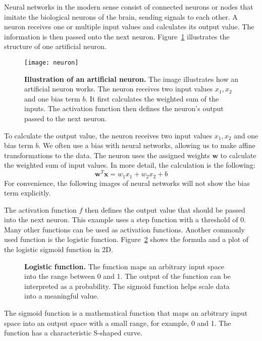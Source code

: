 Neural networks in the modern sense consist of connected neurons or nodes that imitate the biological neurons of the brain, sending signals to each other. A neuron receives one or multiple input values and calculates its output value. The information is then passed onto the next neuron. Figure~\ref{fig:neuron} illustrates the structure of one artificial neuron.
\begin{figure}[ht]
\centering
\texttt{[image: neuron]}
\caption[Illustration of an artificial neuron]{
  \textbf{Illustration of an artificial neuron.}
  The image illustrates how an artificial neuron works. The neuron receives two input values $x_1, x_2$ and one bias term $b$. It first calculates the weighted sum of the inputs. The activation function then defines the neuron's output passed to the next neuron.
}
\label{fig:neuron}
\end{figure}
To calculate the output value, the neuron receives two input values $x_1, x_2$ and one bias term $b$. We often use a bias with neural networks, allowing us to make affine transformations to the data. The neuron uses the assigned weights $\mathbf{w}$ to calculate the weighted sum of input values. In  more detail, the calculation is the following:
\[
  \mathbf{w}^T \mathbf{x} = w_1 x_1 + w_2 x_2 + b
\]
For convenience, the following images of neural networks will not show the bias term explicitly.

The activation function $f$ then defines the output value that should be passed into the next neuron. This example uses a step function with a threshold of 0. Many other functions can be used as activation functions. Another commonly used function is the logistic function. Figure~\ref{fig:sigmoid} shows the formula and a plot of the logistic sigmoid function in 2D.
\begin{figure}[ht]
\centering
{}
\caption[Logistic function]{
 \textbf{Logistic function.}
 The function maps an arbitrary input space into the range between 0 and 1. The output of the function can be interpreted as a probability. The sigmoid function helps scale data into a meaningful value.
}
\label{fig:sigmoid}
\end{figure}
The sigmoid function is a mathematical function that maps an arbitrary input space into an output space with a small range, for example, 0 and 1. The function has a characteristic S-shaped curve.

